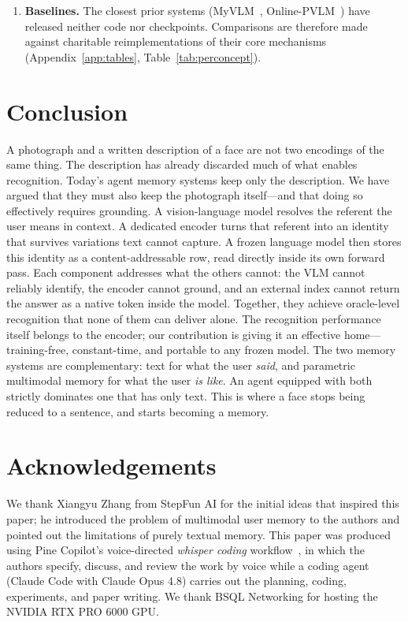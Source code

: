 \begin{enumerate}
  \item \textbf{Baselines.} The closest prior systems (MyVLM~\citep{myvlm}, Online-PVLM~\citep{onlinepvlm}) have released neither code nor checkpoints. Comparisons are therefore made against charitable reimplementations of their core mechanisms (Appendix~\ref{app:tables}, Table~\ref{tab:perconcept}).
\end{enumerate}

\section{Conclusion}
\label{sec:conclusion}

A photograph and a written description of a face are not two encodings of the same thing. The description has already discarded much of what enables recognition. Today's agent memory systems keep only the description. We have argued that they must also keep the photograph itself---and that doing so effectively requires grounding. A vision-language model resolves the referent the user means in context. A dedicated encoder turns that referent into an identity that survives variations text cannot capture. A frozen language model then stores this identity as a content-addressable row, read directly inside its own forward pass. Each component addresses what the others cannot: the VLM cannot reliably identify, the encoder cannot ground, and an external index cannot return the answer as a native token inside the model. Together, they achieve oracle-level recognition that none of them can deliver alone. The recognition performance itself belongs to the encoder; our contribution is giving it an effective home---training-free, constant-time, and portable to any frozen model. The two memory systems are complementary: text for what the user \emph{said}, and parametric multimodal memory for what the user \emph{is like}. An agent equipped with both strictly dominates one that has only text. This is where a face stops being reduced to a sentence, and starts becoming a memory.


\section*{Acknowledgements}

We thank Xiangyu Zhang from StepFun AI for the initial ideas that inspired this paper; he introduced the problem of multimodal user memory to the authors and pointed out the limitations of purely textual memory.
This paper was produced using Pine Copilot's voice-directed \emph{whisper coding} workflow~\citep{pineai2026whispercoding}, in which the authors specify, discuss, and review the work by voice while a coding agent (Claude Code with Claude Opus 4.8) carries out the planning, coding, experiments, and paper writing.
We thank BSQL Networking for hosting the NVIDIA RTX PRO 6000 GPU.


